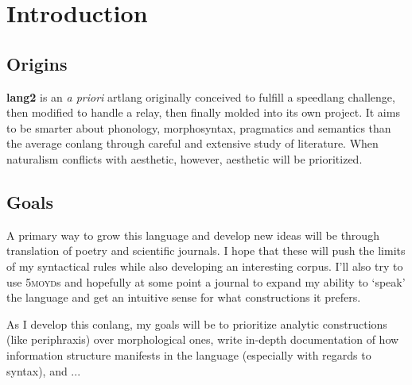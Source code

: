 \documentclass[fontsize=12pt,twoside=false,numbers=noenddot]{kaobook}
\title[A Grammar of \langname{}]{\huge \langname{}}
\subtitle{grammar of a constructed language}
\author[kilenc]{\large Seth Thompson \\ \small \textit{aka} kilenc}
\date{\small \today}
\newcommand{\langname}{\textbf{lang2}}
\newcommand{\gsc}[1]{\textsc{#1}}
\begin{document}
\frontmatter %

\maketitle
{}

\setlength{\textheight}{23cm} %
\etocstandarddisplaystyle %
\etocstandardlines %

\tableofcontents %


\setchapterpreamble[u]{\margintoc}
\chapter{Introduction}
\section{Origins}
\langname{} is an \emph{a priori} artlang originally conceived to fulfill a speedlang challenge, then modified to handle a relay, then finally molded into its own project. It aims to be smarter about phonology, morphosyntax, pragmatics and semantics than the average conlang through careful and extensive  study of literature. When naturalism conflicts with aesthetic, however, aesthetic will be prioritized.

\section{Goals}
A primary way to grow this language and develop new ideas will be through translation of poetry and scientific journals. I hope that these will push the limits of my syntactical rules while also developing an interesting corpus. I'll also try to use \gsc{5moyd}s and hopefully at some point a journal to expand my ability to `speak' the language and get an intuitive sense for what constructions it prefers.

As I develop this conlang, my goals will be to prioritize analytic constructions (like periphraxis) over morphological ones, write in-depth documentation of how information structure manifests in the language (especially with regards to syntax), and ...
\end{document}
